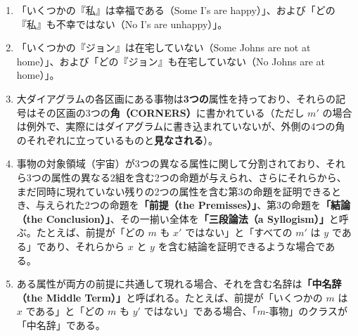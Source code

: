 \documentclass[a4paper,11pt,openany]{ltjsbook}
\begin{document}
\begin{enumerate}[label=\textbf{\arabic*.}]
\item 「いくつかの『私』は幸福である（Some I's are happy）」、および「どの『私』も不幸ではない（No I's are unhappy）」。
\item 「いくつかの『ジョン』は在宅していない（Some Johns are not at home）」、および「どの『ジョン』も在宅していない（No Johns are at home）」。
\item 大ダイアグラムの各区画にある事物は\textbf{3つの}属性を持っており、それらの記号はその区画の3つの\textbf{角（CORNERS）}に書かれている（ただし $m'$ の場合は例外で、実際にはダイアグラムに書き込まれていないが、外側の4つの角のそれぞれに立っているものと\textbf{見なされる}）。
\item 事物の対象領域（宇宙）が3つの異なる属性に関して分割されており、それら3つの属性の異なる2組を含む2つの命題が与えられ、さらにそれらから、まだ同時に現れていない残りの2つの属性を含む第3の命題を証明できるとき、与えられた2つの命題を\textbf{「前提（the Premisses）」}、第3の命題を\textbf{「結論（the Conclusion）」}、その一揃い全体を\textbf{「三段論法（a Syllogism）」}と呼ぶ。たとえば、前提が「どの $m$ も $x'$ ではない」と「すべての $m'$ は $y$ である」であり、それらから $x$ と $y$ を含む結論を証明できるような場合である。
\item ある属性が両方の前提に共通して現れる場合、それを含む名辞は\textbf{「中名辞（the Middle Term）」}と呼ばれる。たとえば、前提が「いくつかの $m$ は $x$ である」と「どの $m$ も $y'$ ではない」である場合、「$m$-事物」のクラスが「中名辞」である。


\end{enumerate}
\end{document}
